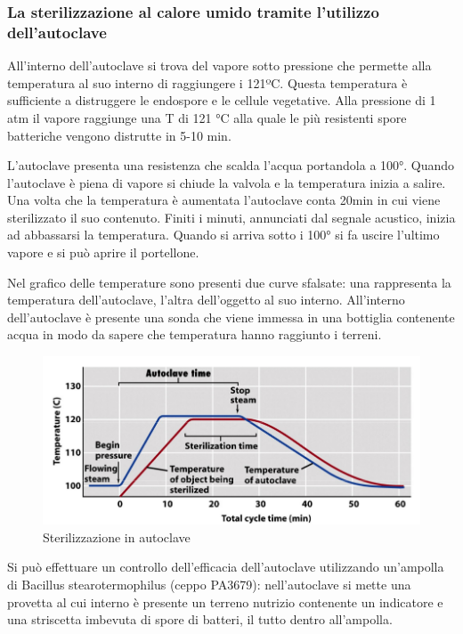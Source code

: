 \documentclass[11pt]{book}
\begin{document}
\subsubsection{La sterilizzazione al calore umido tramite l'utilizzo dell’autoclave}

All'interno dell'autoclave si trova del vapore sotto pressione che permette alla temperatura al suo interno di raggiungere i 121ºC. Questa temperatura è sufficiente a distruggere le endospore e le cellule vegetative.
Alla pressione di 1 atm il vapore raggiunge una T di 121 °C alla quale le più resistenti spore batteriche vengono distrutte in 5-10 min. 

L'autoclave presenta una resistenza che scalda l’acqua portandola a 100°. Quando l'autoclave è piena di vapore si chiude la valvola e la temperatura inizia a salire. Una volta che la temperatura è aumentata l’autoclave conta 20min in cui viene sterilizzato il suo contenuto. Finiti i minuti, annunciati dal segnale acustico, inizia ad abbassarsi la temperatura. Quando si arriva sotto i 100° si fa uscire l’ultimo vapore e si può aprire il portellone.

Nel grafico delle temperature sono presenti due curve sfalsate: una rappresenta la temperatura dell’autoclave, l’altra dell’oggetto al suo interno. All’interno dell’autoclave è presente una sonda che viene immessa in una bottiglia contenente acqua in modo da sapere che temperatura hanno raggiunto i terreni. 

\begin{figure}[htp]
\centering
\includegraphics[scale=0.5]{img/Autoclave.png}
\caption{Sterilizzazione in autoclave}
\label{}
\end{figure}

Si può effettuare un controllo dell’efficacia dell'autoclave utilizzando un'ampolla di Bacillus stearotermophilus (ceppo PA3679): nell'autoclave si mette una provetta al cui interno è presente un terreno nutrizio contenente un indicatore e una striscetta imbevuta di spore di batteri, il tutto dentro all'ampolla. 
\end{document}
